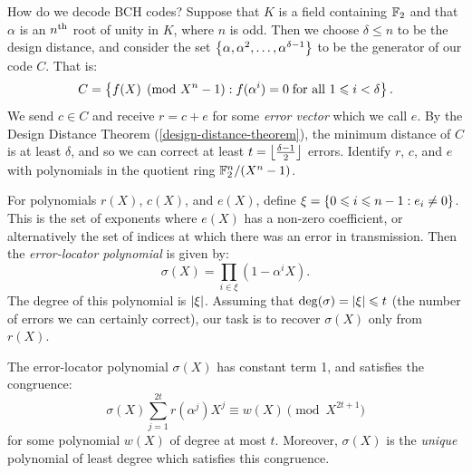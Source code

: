 \documentclass{article}
\begin{document}
How do we decode BCH codes? Suppose that $K$ is a field containing $\mathbb{F}_2$ and that $\alpha$ is an $n^{\text{th}}$ root of unity in $K$, where $n$ is odd. Then we choose $\delta \leq n$ to be the design distance, and consider the set $\left\lbrace \alpha, \alpha^2, \dots, \alpha^{\delta-1} \right\rbrace$ to be the generator of our code $C$. That is:
\[
C = \left\lbrace f(X) \pmod{X^n-1} : f(\alpha^i) = 0 \; \text{for all } 1 \leqslant i < \delta \right\rbrace.
\]
We send $c \in C$ and receive $r = c + e$ for some \textit{error vector} which we call $e$. By the Design Distance Theorem (\ref{design-distance-theorem}), the minimum distance of $C$ is at least $\delta$, and so we can correct at least $t = \left\lfloor\frac{\delta-1}{2}\right\rfloor$ errors. Identify $r$, $c$, and $e$ with polynomials in the quotient ring $\mathbb{F}_2^n/(X^n-1)$.

\begin{definition}
    For polynomials $r(X)$, $c(X)$, and $e(X)$, define $\xi = \left\lbrace 0 \leqslant i \leqslant n-1 : e_i \neq 0 \right\rbrace$. This is the set of exponents where $e(X)$ has a non-zero coefficient, or alternatively the set of indices at which there was an error in transmission.
    Then the \textit{error-locator polynomial} is given by:
    \[
	\sigma(X) = \prod_{i \in \xi} (1-\alpha^i X).
	\]
	The degree of this polynomial is $\left\lvert \xi \right\rvert$. Assuming that $\deg(\sigma) = \left\lvert \xi \right\rvert \leqslant t$ (the number of errors we can certainly correct), our task is to recover $\sigma(X)$ only from $r(X)$.
\end{definition}

\begin{theorem}
	\label{error-locator-polynomial-recovery}
    The error-locator polynomial $\sigma(X)$ has constant term 1, and satisfies the congruence:
    \[
	\sigma(X) \sum_{j=1}^{2t} r(\alpha^j)X^j \equiv w(X) \pmod{X^{2t+1}}
	\]
	for some polynomial $w(X)$ of degree at most $t$. Moreover, $\sigma(X)$ is the \textit{unique} polynomial of least degree which satisfies this congruence.
\end{theorem}
\end{document}
